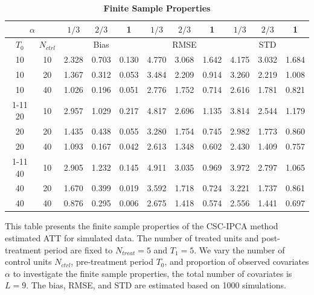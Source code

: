 \documentclass[12pt]{article}
\begin{document}
\begin{table}[!ht]
    \centering
    \caption{\textbf{Finite Sample Properties}}
    \label{tab: finite sample}
    \begin{tabular}{cc|ccc|ccc|ccc}
    \toprule
    \multicolumn{2}{c|}{$\alpha$} & $1/3$ & $2/3$ & 1 & $1/3$ & $2/3$ & 1 & $1/3$ & $2/3$ & 1 \\
    \hline
    $T_0$ & $N_{ctrl}$ & \multicolumn{3}{c|}{Bias} & \multicolumn{3}{c|}{RMSE}  & \multicolumn{3}{c}{STD} \\
    \hline
    10 & 10 & 2.328 & 0.703 & 0.130 & 4.770 & 3.068 & 1.642 & 4.175 & 3.032 & 1.684 \\
    10 & 20 & 1.367 & 0.312 & 0.053 & 3.484 & 2.209 & 0.914 & 3.260 & 2.219 & 1.008 \\
    10 & 40 & 1.026 & 0.196 & 0.051 & 2.776 & 1.752 & 0.714 & 2.616 & 1.781 & 0.821 \\
    \cline{1-11}
    20 & 10 & 2.957 & 1.029 & 0.217 & 4.817 & 2.696 & 1.135 & 3.814 & 2.544 & 1.179 \\
    20 & 20 & 1.435 & 0.438 & 0.055 & 3.280 & 1.754 & 0.745 & 2.982 & 1.773 & 0.860 \\
    20 & 40 & 1.093 & 0.167 & 0.042 & 2.613 & 1.348 & 0.602 & 2.430 & 1.409 & 0.757 \\
    \cline{1-11}
    40 & 10 & 2.905 & 1.232 & 0.145 & 4.911 & 3.035 & 0.969 & 3.972 & 2.797 & 1.065 \\
    40 & 20 & 1.670 & 0.399 & 0.019 & 3.592 & 1.718 & 0.724 & 3.221 & 1.737 & 0.861 \\
    40 & 40 & 0.876 & 0.295 & 0.006 & 2.675 & 1.418 & 0.574 & 2.556 & 1.441 & 0.697 \\
    \bottomrule
    \end{tabular}
    \begin{tablenotes}
        \item This table presents the finite sample properties of the CSC-IPCA method estimated ATT for simulated data. The number of treated units and post-treatment period are fixed to $N_{treat} = 5$ and $T_1=5$. We vary the number of control units $N_{ctrl}$, pre-treatment period $T_0$, and proportion of observed covariates $\alpha$ to investigate the finite sample properties, the total number of covariates is $L=9$. The bias, RMSE, and STD are estimated based on 1000 simulations.
    \end{tablenotes}
\end{table}

\end{document}
